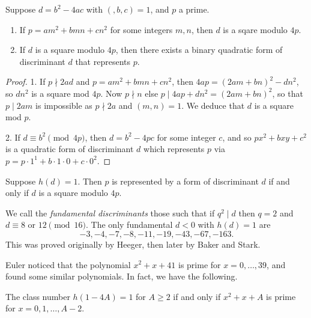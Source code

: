 \begin{prop}
Suppose $d=b^2-4 a c$ with $(,b,c)=1$, and $p$ a prime. 
\begin{enumerate}
  \item If $p=a m^2+b m n+c n^2$ for some integers $m,n$, then $d$ is a sqare 
    modulo $4 p$. 
  \item If $d$ is a square modulo $4 p$, then there exists a binary quadratic 
    form of discriminant $d$ that represents $p$. 
\end{enumerate}
\end{prop}
\begin{proof}
1. If $p\nmid 2 a d$ and $p=a m^2+b m n+c n^2$, then 
$4 a p = (2 a m+b n)^2-d n^2$, so $d n^2$ is a square mod $4 p$. Now 
$p\nmid n$ else $p\mid 4 a p+d n^2=(2 a m+b n)^2$, so that $p\mid 2 am$ is 
impossible as $p\nmid 2 a$ and $(m,n)=1$. We deduce that $d$ is a square mod 
$p$. 

2. If $d\equiv b^2\pmod{4p}$, then $d=b^2-4 p c$ for some integer $c$, and so 
$p x^2+b x y+c^2$ is a quadratic form of discriminant $d$ which represents $p$ 
via $p=p\cdot 1^1 + b\cdot 1\cdot 0 + c\cdot 0^2$. 
\end{proof}

\begin{theo}
Suppose $h(d)=1$. Then $p$ is represented by a form of discriminant $d$ if and 
only if $d$ is a square modulo $4 p$. 
\end{theo}

We call the \emph{fundamental discriminants} those such that if $q^2\mid d$ 
then $q=2$ and $d\equiv 8$ or $12\pmod{16}$. The only fundamental $d<0$ with 
$h(d)=1$ are 
\[
  -3,-4,-7,-8,-11,-19,-43,-67,-163 .
\]
This was proved originally by Heeger, then later by Baker and Stark. 

Euler noticed that the polynomial $x^2+x+41$ is prime for $x=0,\dots,39$, and 
found some similar polynomials. In fact, we have the following. 

\begin{theo}[Rabinowiscz]
The class number $h(1-4 A)=1$ for $A\geqslant 2$ if and only if 
$x^2+x+A$ is prime for $x=0,1,\dots,A-2$. 
\end{theo}

